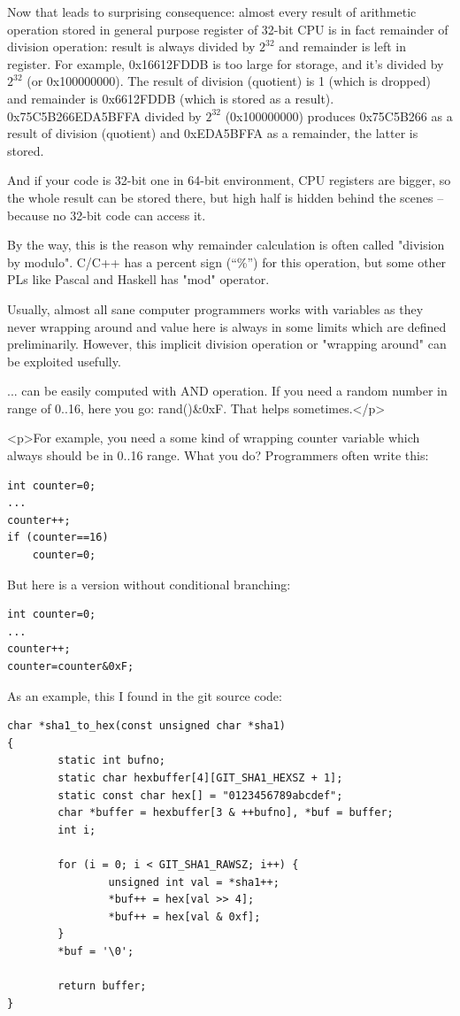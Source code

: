 Now that leads to surprising consequence: almost every result of arithmetic operation stored in general purpose register of
32-bit CPU is in fact
remainder of division operation: result is always divided by $2^{32}$ and remainder is left in register.
For example, 0x16612FDDB is too large for storage, and it's divided by $2^{32}$ (or 0x100000000).
The result of division (quotient) is 1 (which is dropped) and remainder is 0x6612FDDB (which is stored as a result).
0x75C5B266EDA5BFFA divided by $2^{32}$ (0x100000000) produces 0x75C5B266 as a result of division (quotient) and 0xEDA5BFFA as a remainder, the latter is stored.

And if your code is 32-bit one in 64-bit environment, CPU registers are bigger, so the whole result can be stored there,
but high half is hidden behind the scenes -- because no 32-bit code can access it.

By the way, this is the reason why remainder calculation is often called "division by modulo".
C/C++ has a percent sign (``\%'') for this operation, but some other PLs like Pascal and Haskell has "mod" operator.

Usually, almost all sane computer programmers works with variables as they never wrapping around and value here is always in some limits which
are defined preliminarily.
However, this implicit division operation or "wrapping around" can be exploited usefully.


... can be easily computed with AND operation.
If you need a random number in range of 0..16, here you go: rand()\&0xF.
That helps sometimes.</p>

<p>For example, you need a some kind of wrapping counter variable which always should be in 0..16 range. What you do?
Programmers often write this:

\begin{lstlisting}[style=customc]
int counter=0;
...
counter++;
if (counter==16)
    counter=0;
\end{lstlisting}

But here is a version without conditional branching:

\begin{lstlisting}[style=customc]
int counter=0;
...
counter++;
counter=counter&0xF;
\end{lstlisting}

As an example, this I found in the git source code:

\begin{lstlisting}[style=customc]
char *sha1_to_hex(const unsigned char *sha1)
{
        static int bufno;
        static char hexbuffer[4][GIT_SHA1_HEXSZ + 1];
        static const char hex[] = "0123456789abcdef";
        char *buffer = hexbuffer[3 & ++bufno], *buf = buffer;
        int i;

        for (i = 0; i < GIT_SHA1_RAWSZ; i++) {
                unsigned int val = *sha1++;
                *buf++ = hex[val >> 4];
                *buf++ = hex[val & 0xf];
        }
        *buf = '\0';

        return buffer;
}
\end{lstlisting}

